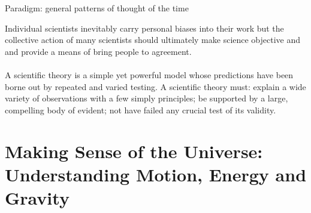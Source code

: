 \documentclass[12pt]{article}
\begin{document}
\begin{definition} Paradigm: general patterns of thought of the time \end{definition} 
Individual scientists inevitably carry personal biases into their work but the collective action of many scientists should ultimately make science objective and and provide a means of bring people to agreement. \\~\\
A scientific theory is a simple yet powerful model whose predictions have been borne out by repeated and varied testing. A scientific theory must: explain a wide variety of observations with a few simply principles; be supported by a large, compelling body of evident; not have failed any crucial test of its validity.

\section{Making Sense of the Universe: Understanding Motion, Energy and Gravity} 
\end{document}
